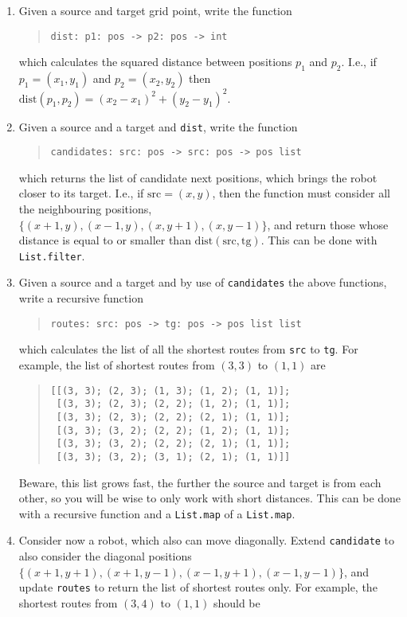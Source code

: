 \begin{enumerate}
\item Given a source and target grid point, write the function
\begin{quote}
  \lstinline{dist: p1: pos -> p2: pos -> int}
\end{quote}
  which calculates the squared distance between positions $p_1$ and $p_2$. I.e., if $p_1 = (x_1,y_1)$ and $p_2 = (x_2,y_2)$ then $\text{dist}(p_1,p_2)=(x_2-x_1)^2+(y_2-y_1)^2$.
\item Given a source and a target and \lstinline{dist}, write the function
\begin{quote}
  \lstinline{candidates: src: pos -> src: pos -> pos list}
\end{quote}
which returns the list of candidate next positions, which brings the robot closer to its target. I.e., if $\text{src}=(x,y)$, then the function must consider all the neighbouring positions, $\{(x+1,y),(x-1,y),(x,y+1),(x,y-1)\}$, and return those whose distance is equal to or smaller than $\text{dist}(\text{src},\text{tg})$. This can be done with \lstinline{List.filter}.
\item Given a source and a target and by use of \lstinline{candidates} the above functions, write a recursive function
\begin{quote}
  \lstinline{routes: src: pos -> tg: pos -> pos list list}
\end{quote}
which calculates the list of all the shortest routes from \lstinline{src} to \lstinline{tg}. For example, the list of shortest routes from $(3, 3)$ to $(1, 1)$ are
\begin{quote}
  \lstinline{[[(3, 3); (2, 3); (1, 3); (1, 2); (1, 1)];}\\
  \lstinline{ [(3, 3); (2, 3); (2, 2); (1, 2); (1, 1)];}\\
  \lstinline{ [(3, 3); (2, 3); (2, 2); (2, 1); (1, 1)];}\\
  \lstinline{ [(3, 3); (3, 2); (2, 2); (1, 2); (1, 1)];}\\
  \lstinline{ [(3, 3); (3, 2); (2, 2); (2, 1); (1, 1)];}\\
  \lstinline{ [(3, 3); (3, 2); (3, 1); (2, 1); (1, 1)]]}
\end{quote}
Beware, this list grows fast, the further the source and target is from each other, so you will be wise to only work with short distances. This can be done with a recursive function and a \lstinline{List.map} of a \lstinline{List.map}.
\item Consider now a robot, which also can move diagonally. Extend \lstinline{candidate} to also consider the diagonal positions $\{(x+1,y+1),(x+1,y-1),(x-1,y+1),(x-1,y-1)\}$, and update \lstinline{routes} to return the list of shortest routes only. For example, the shortest routes from $(3, 4)$ to $(1, 1)$ should be

\end{enumerate}
